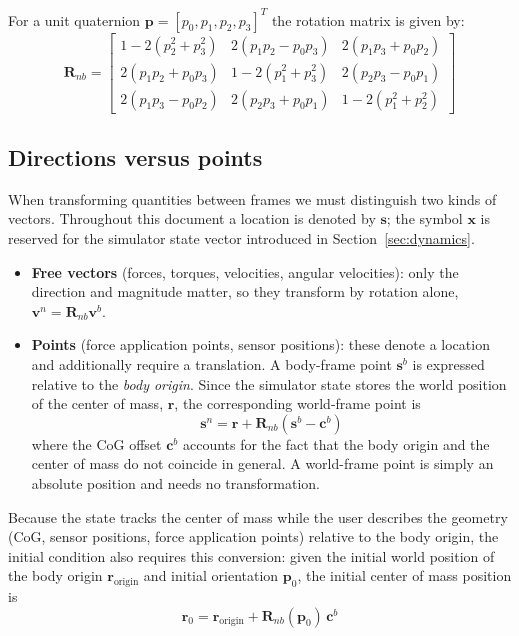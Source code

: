 \documentclass{article}
\begin{document}
	For a unit quaternion $\mathbf{p} = [p_0, p_1, p_2, p_3]^T$ the rotation matrix is given by:
	\begin{equation}
		\mathbf{R}_{nb} =
		\begin{bmatrix}
			1 - 2(p_2^2 + p_3^2) & 2(p_1 p_2 - p_0 p_3) & 2(p_1 p_3 + p_0 p_2) \\
			2(p_1 p_2 + p_0 p_3) & 1 - 2(p_1^2 + p_3^2) & 2(p_2 p_3 - p_0 p_1) \\
			2(p_1 p_3 - p_0 p_2) & 2(p_2 p_3 + p_0 p_1) & 1 - 2(p_1^2 + p_2^2)
		\end{bmatrix}
	\end{equation}

	\subsection{Directions versus points}

	When transforming quantities between frames we must distinguish two kinds of vectors. Throughout this document a location is denoted by $\mathbf{s}$; the symbol $\mathbf{x}$ is reserved for the simulator state vector introduced in Section~\ref{sec:dynamics}.
	\begin{itemize}
		\item \textbf{Free vectors} (forces, torques, velocities, angular velocities): only the direction and magnitude matter, so they transform by rotation alone, $\mathbf{v}^n = \mathbf{R}_{nb}\mathbf{v}^b$.
		\item \textbf{Points} (force application points, sensor positions): these denote a location and additionally require a translation. A body-frame point $\mathbf{s}^b$ is expressed relative to the \emph{body origin}. Since the simulator state stores the world position of the center of mass, $\mathbf{r}$, the corresponding world-frame point is
		\begin{equation}
			\mathbf{s}^n = \mathbf{r} + \mathbf{R}_{nb}\left( \mathbf{s}^b - \mathbf{c}^b \right)
			\label{eq:point-transform}
		\end{equation}
		where the CoG offset $\mathbf{c}^b$ accounts for the fact that the body origin and the center of mass do not coincide in general. A world-frame point is simply an absolute position and needs no transformation.
	\end{itemize}

	Because the state tracks the center of mass while the user describes the geometry (CoG, sensor positions, force application points) relative to the body origin, the initial condition also requires this conversion: given the initial world position of the body origin $\mathbf{r}_{\text{origin}}$ and initial orientation $\mathbf{p}_0$, the initial center of mass position is
	\begin{equation}
		\mathbf{r}_0 = \mathbf{r}_{\text{origin}} + \mathbf{R}_{nb}(\mathbf{p}_0)\,\mathbf{c}^b
	\end{equation}
	
\end{document}
